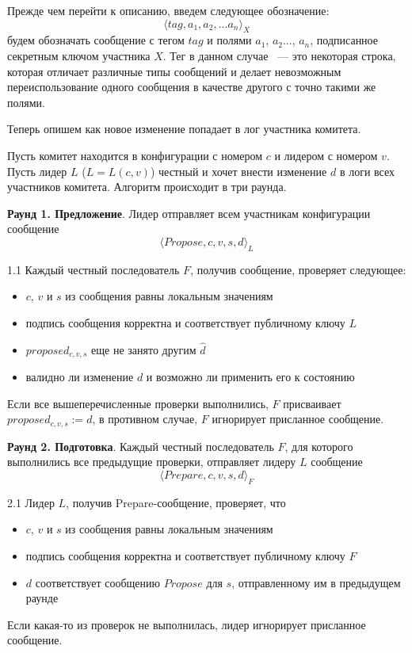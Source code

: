 Прежде чем перейти к описанию, введем следующее обозначение:
\[ \langle tag, a_1, a_2, ... a_n \rangle_X \] будем обозначать сообщение с тегом $tag$ и полями $a_1$, $a_2$..., $a_n$, подписанное секретным ключом участника $X$. Тег в данном случае ~--- это некоторая строка, которая отличает различные типы сообщений и делает невозможным переиспользование одного сообщения в качестве другого с точно такими же полями.

Теперь опишем как новое изменение попадает в лог участника комитета.

Пусть комитет находится в конфигурации с номером $c$ и лидером с номером $v$. 
Пусть лидер $L$ ($L = L(c, v)$) честный и хочет внести изменение $d$ в логи всех участников комитета. Алгоритм происходит в три раунда.

\textbf{Раунд 1. Предложение}. Лидер отправляет всем участникам конфигурации сообщение 
\[ \langle Propose, c, v, s, d \rangle_L \]

1.1 Каждый честный последователь $F$, получив сообщение, проверяет следующее:
\begin{itemize}
\item $c$, $v$ и $s$ из сообщения равны локальным значениям
\item подпись сообщения корректна и соответствует публичному ключу $L$
\item $proposed_{c, v, s}$ еще не занято другим $\hat d$
\item валидно ли изменение $d$ и возможно ли применить его к состоянию
\end{itemize}

Если все вышеперечисленные проверки выполнились, $F$ присваивает $proposed_{c, v, s} := d$, в противном случае, $F$ игнорирует присланное сообщение. 
\vspace{10pt}

\textbf{Раунд 2. Подготовка}. Каждый честный последователь $F$, для которого выполнились все предыдущие проверки, отправляет лидеру $L$ сообщение 
\[ \langle Prepare, c, v, s, d \rangle_F \]

2.1 Лидер $L$, получив Prepare-сообщение, проверяет, что
\begin{itemize}
\item $c$, $v$ и $s$ из сообщения равны локальным значениям
\item подпись сообщения корректна и соответствует публичному ключу $F$
\item $d$ соответствует сообщению $Propose$ для $s$, отправленному им в предыдущем раунде
\end{itemize}
Если какая-то из проверок не выполнилась, лидер игнорирует присланное сообщение. 


